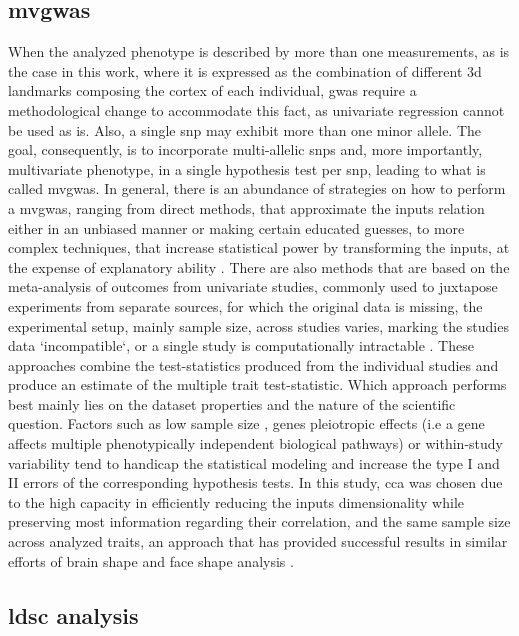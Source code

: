 \subsection{\Acf{mvgwas}}
When the analyzed phenotype is described by more than one measurements, as is the case in this work, where it is expressed as the combination of different \ac{3d} landmarks composing the cortex of each individual, \ac{gwas} require a methodological change to accommodate this fact, as univariate regression cannot be used as is. Also, a single \ac{snp} may exhibit more than one minor allele. The goal, consequently, is to incorporate multi-allelic \acsp{snp} and, more importantly, multivariate phenotype, in a single hypothesis test per \ac{snp}, leading to what is called \acf{mvgwas}. In general, there is an abundance of strategies on how to perform a \ac{mvgwas}, ranging from direct methods, that approximate the inputs relation either in an unbiased manner or making certain educated guesses, to more complex techniques, that increase statistical power by transforming the inputs, at the expense of explanatory ability \cite{Galesloot2014}. There are also methods that are based on the meta-analysis of outcomes from univariate studies, commonly used to juxtapose experiments from separate sources, for which the original data is missing, the experimental setup, mainly sample size, across studies varies, marking the studies data `incompatible`, or a single study is computationally intractable \cite{Uffelmann2021,Cichonska2016}. These approaches combine the test-statistics produced from the individual studies and produce an estimate of the multiple trait test-statistic. Which approach performs best mainly lies on the dataset properties and the nature of the scientific question. Factors such as low sample size \cite{Sheng2021}, genes pleiotropic effects \cite{Fernandes2021} (i.e a gene affects multiple phenotypically independent biological pathways) or within-study variability \cite{Usui2021,Jackson2011} tend to handicap the statistical modeling and increase the type I and II errors of the corresponding hypothesis tests. In this study, \ac{cca} was chosen due to the high capacity in efficiently reducing the inputs dimensionality while preserving most information regarding their correlation, and the same sample size across analyzed traits, an approach that has provided successful results in similar efforts of brain shape and face shape analysis \cite{Claes2018,Naqvi2021}.

\subsection{\Ac{ldsc} analysis}

